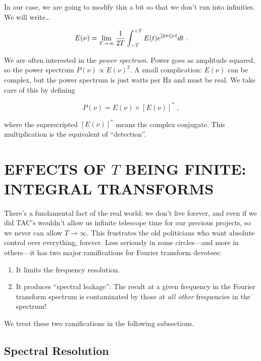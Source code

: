 \documentclass[psfig,preprint]{aastex}
\begin{document}
In our case, we are going to modify this a bit so that we don't run into
infinities. We will write\dots

\begin{equation} \label{eqtwo}
E(\nu) = \lim_{T \to \infty} {1 \over 2T}
\int_{-T}^{+T} E(t) e^{[2 \pi i]\nu t}  dt \; .
\end{equation}

\noindent We are often interested in the {\it power spectrum}.   Power
goes as amplitude squared, so the power spectrum $P(\nu ) \propto E(\nu
)^2$.  A small complication: $E(\nu)$ can be complex, but the power
spectrum is just watts per Hz and must be real.  We take care of this by
defining

\begin{equation}
P(\nu ) = E(\nu ) \times [E(\nu )]^* \; ,
\end{equation}

\noindent where the superscripted $[E(\nu)]^*$ means the complex
conjugate.  This multiplication is the equivalent of ``detection''. 

\section{EFFECTS OF $T$ BEING FINITE: INTEGRAL TRANSFORMS}

\label{sectiontwo}

	There's a fundamental fact of the real world: we don't live
forever, and even if we did TAC's wouldn't allow us infinite telescope
time for our precious projects, so we never can allow $T \rightarrow
\infty$.  This frustrates the old politicians who want absolute control
over everything, forever.  Less seriously in some circles---and more in
others---it has two major ramifications for Fourier transform devotees:
\begin{enumerate}

	\item It limits the frequency resolution.

	\item It produces ``spectral leakage'': The result at a given
frequency in the Fourier transform spectrum is contaminated by those at
{\it all other} frequencies in the spectrum!
\end{enumerate}

	We treat these two ramifications in the following subsections.

\subsection{Spectral Resolution} \label{spctres}
\end{document}
